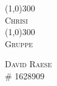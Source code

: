 \begin{titlepage}
  
  \begin{center}
    \line(1,0){300}\\
    [0.25in]
    \textsc{\Huge{Chrisi}}\\
    [3mm]
    \line(1,0){300}\\
    [1in]
    \textsc{\Large{Gruppe}}\\


    \begin{flushright}
      \textsc{David Raese\\
      \# 1628909}
    \end{flushright}
  \end{center}
\end{titlepage}
